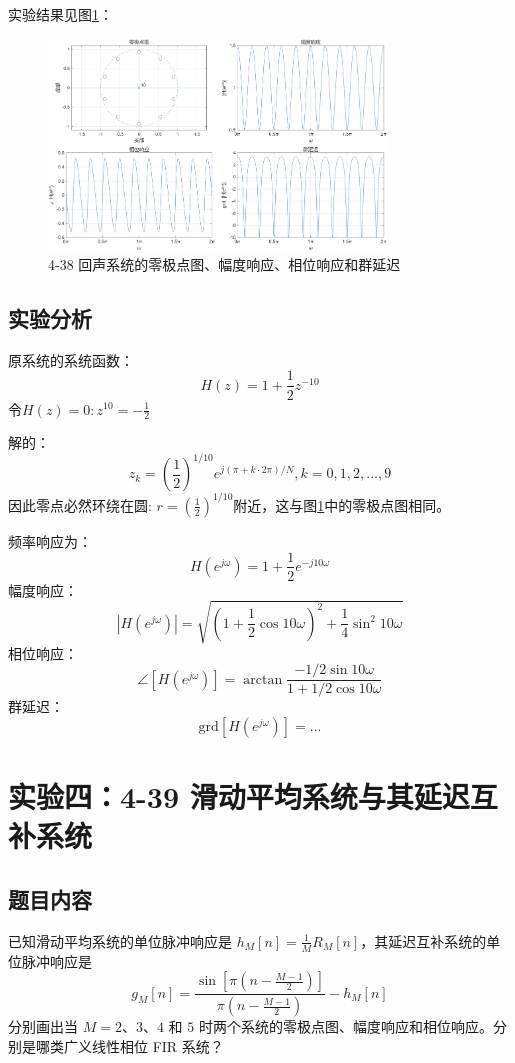 \documentclass[UTF8,12pt,a4paper]{ctexart}
\begin{document}
实验结果见图\ref{fig:4-38}：

\begin{figure}[htbp]
    \centering
    \includegraphics[width=0.8\textwidth]{4-38 回声系统.png}
    \caption{4-38 回声系统的零极点图、幅度响应、相位响应和群延迟}
    \label{fig:4-38}
\end{figure}

\subsection{实验分析}

原系统的系统函数：
$$H(z)=1+\frac{1}{2}z^{-10}$$
令$H(z)=0: z^{10}=-\frac{1}{2}$

解的：
$$z_k=(\frac{1}{2})^{1/10}e^{j(\pi + k\cdot 2\pi)/N}, k=0,1,2,...,9$$
因此零点必然环绕在圆: $r=(\frac{1}{2})^{1/10}$附近，这与图\ref{fig:4-38}中的零极点图相同。

频率响应为：$$H(e^{j\omega})=1+\frac{1}{2}e^{-j10\omega}$$
幅度响应：$$|H(e^{j\omega})|=\sqrt{(1+\frac{1}{2}\cos{10\omega})^2+\frac{1}{4}\sin^2{10\omega}}$$
相位响应：$$\angle [H(e^{j\omega})] = \arctan \frac{-1/2\sin{10\omega}}{1+1/2\cos{10\omega}}$$
群延迟：$$\text{grd} [H(e^{j\omega})] = ...$$

\section{实验四：4-39 滑动平均系统与其延迟互补系统}

\subsection{题目内容}

已知滑动平均系统的单位脉冲响应是 $h_M[n] = \frac{1}{M}R_M[n]$，其延迟互补系统的单位脉冲响应是
$$
g_M[n] = \frac{\sin\left[\pi\left(n - \frac{M-1}{2}\right)\right]}{\pi\left(n - \frac{M-1}{2}\right)} - h_M[n]
$$
分别画出当 $M=2$、$3$、$4$ 和 $5$ 时两个系统的零极点图、幅度响应和相位响应。分别是哪类广义线性相位 FIR 系统？
\end{document}
